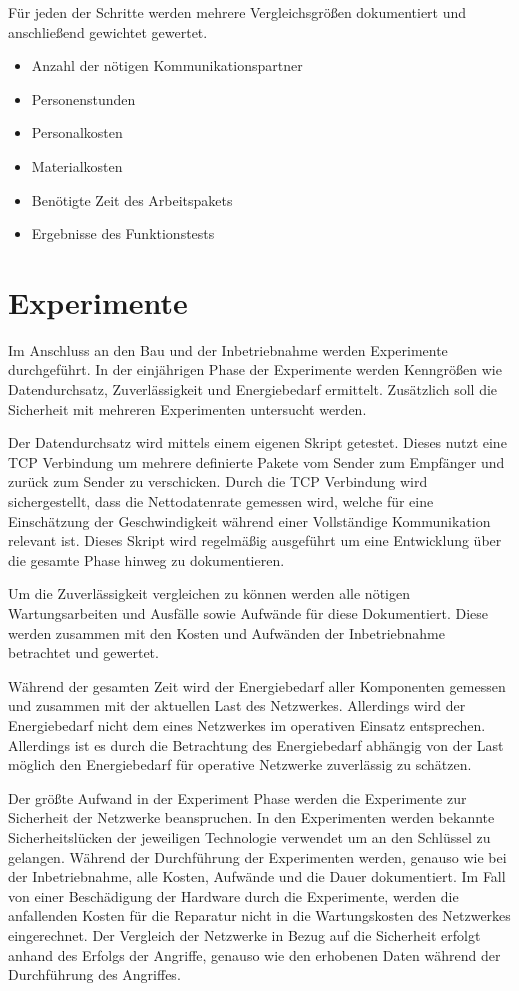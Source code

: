 Für jeden der Schritte werden mehrere Vergleichsgrößen dokumentiert und anschließend gewichtet gewertet.

\begin{itemize}
    \item Anzahl der nötigen Kommunikationspartner
    \item Personenstunden
    \item Personalkosten
    \item Materialkosten
    \item Benötigte Zeit des Arbeitspakets
    \item Ergebnisse des Funktionstests
\end{itemize}

\section{Experimente}

Im Anschluss an den Bau und der Inbetriebnahme werden Experimente durchgeführt.
In der einjährigen Phase der Experimente werden Kenngrößen wie Datendurchsatz, Zuverlässigkeit und Energiebedarf ermittelt.
Zusätzlich soll die Sicherheit mit mehreren Experimenten untersucht werden.

Der Datendurchsatz wird mittels einem eigenen Skript getestet.
Dieses nutzt eine \ac{TCP} Verbindung um mehrere definierte Pakete vom Sender zum Empfänger und zurück zum Sender zu verschicken.
Durch die \ac{TCP} Verbindung wird sichergestellt, dass die Nettodatenrate gemessen wird, welche für eine Einschätzung der Geschwindigkeit während einer Vollständige Kommunikation relevant ist.
Dieses Skript wird regelmäßig ausgeführt um eine Entwicklung über die gesamte Phase hinweg zu dokumentieren.

Um die Zuverlässigkeit vergleichen zu können werden alle nötigen Wartungsarbeiten und Ausfälle sowie Aufwände für diese Dokumentiert.
Diese werden zusammen mit den Kosten und Aufwänden der Inbetriebnahme betrachtet und gewertet.

Während der gesamten Zeit wird der Energiebedarf aller Komponenten gemessen und zusammen mit der aktuellen Last des Netzwerkes.
Allerdings wird der Energiebedarf nicht dem eines Netzwerkes im operativen Einsatz entsprechen.
Allerdings ist es durch die Betrachtung des Energiebedarf abhängig von der Last möglich den Energiebedarf für operative Netzwerke zuverlässig zu schätzen.

Der größte Aufwand in der Experiment Phase werden die Experimente zur Sicherheit der Netzwerke beanspruchen.
In den Experimenten werden bekannte Sicherheitslücken der jeweiligen Technologie verwendet um an den Schlüssel zu gelangen.
Während der Durchführung der Experimenten werden, genauso wie bei der Inbetriebnahme, alle Kosten, Aufwände und die Dauer dokumentiert.
Im Fall von einer Beschädigung der Hardware durch die Experimente, werden die anfallenden Kosten für die Reparatur nicht in die Wartungskosten des Netzwerkes eingerechnet.
Der Vergleich der Netzwerke in Bezug auf die Sicherheit erfolgt anhand des Erfolgs der Angriffe, genauso wie den erhobenen Daten während der Durchführung des Angriffes.

